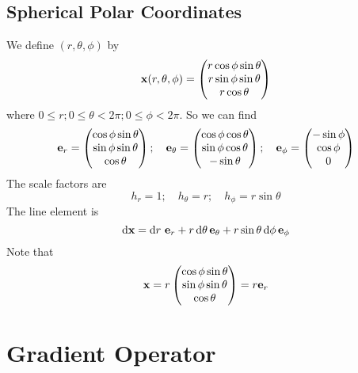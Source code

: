 \documentclass{article}
\begin{document}
\subsection{Spherical Polar Coordinates}
We define $(r, \theta, \phi)$ by
\[ \vb x(r, \theta, \phi) = \begin{pmatrix}
        r \cos \phi \sin \theta \\
        r \sin \phi \sin \theta \\
        r \cos \theta
    \end{pmatrix} \]
where $0 \leq r; 0 \leq \theta < 2 \pi; 0 \leq \phi < 2 \pi$. So we can find
\[ \vb e_r = \begin{pmatrix}
        \cos \phi \sin \theta \\ \sin \phi \sin \theta \\ \cos \theta
    \end{pmatrix};\quad \vb e_\theta = \begin{pmatrix}
        \cos \phi \cos \theta \\ \sin \phi \cos \theta \\ -\sin \theta
    \end{pmatrix};\quad \vb e_\phi = \begin{pmatrix}
        -\sin \phi \\ \cos \phi \\ 0
    \end{pmatrix} \]
The scale factors are
\[ h_r = 1;\quad h_\theta = r;\quad h_\phi = r \sin \theta \]
The line element is
\[ \dd \vb x = \dd{r} \, \vb e_r + r \, \dd \theta \, \vb e_\theta + r \sin \theta \, \dd \phi \, \vb e_\phi \]
Note that
\[ \vb x = r \begin{pmatrix}
        \cos \phi \sin \theta \\ \sin \phi \sin \theta \\ \cos \theta
    \end{pmatrix} = r \vb e_r \]

\section{Gradient Operator}
\end{document}
